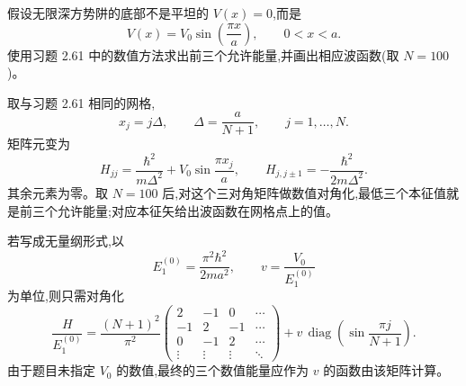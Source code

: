 \begin{question}
假设无限深方势阱的底部不是平坦的 $V(x)=0$,而是
\[
V(x)=V_0\sin\left(\frac{\pi x}{a}\right),\qquad 0<x<a .
\]
使用习题 2.61 中的数值方法求出前三个允许能量,并画出相应波函数(取 $N=100$)。
\end{question}
\begin{solution}
取与习题 2.61 相同的网格,
\[
x_j=j\Delta,
\qquad \Delta=\frac{a}{N+1},
\qquad j=1,\ldots,N.
\]
矩阵元变为
\[
H_{jj}=\frac{\hbar^2}{m\Delta^2}+V_0\sin\frac{\pi x_j}{a},
\qquad
H_{j,j\pm1}=-\frac{\hbar^2}{2m\Delta^2}.
\]
其余元素为零。取 $N=100$ 后,对这个三对角矩阵做数值对角化,最低三个本征值就是前三个允许能量;对应本征矢给出波函数在网格点上的值。

若写成无量纲形式,以
\[
E_1^{(0)}=\frac{\pi^2\hbar^2}{2ma^2},
\qquad v=\frac{V_0}{E_1^{(0)}}
\]
为单位,则只需对角化
\[
\frac{H}{E_1^{(0)}}=\frac{(N+1)^2}{\pi^2}
\begin{pmatrix}
2&-1&0&\cdots\\
-1&2&-1&\cdots\\
0&-1&2&\cdots\\
\vdots&\vdots&\vdots&\ddots
\end{pmatrix}
+v\,\operatorname{diag}\left(\sin\frac{\pi j}{N+1}\right).
\]
由于题目未指定 $V_0$ 的数值,最终的三个数值能量应作为 $v$ 的函数由该矩阵计算。
\end{solution}

